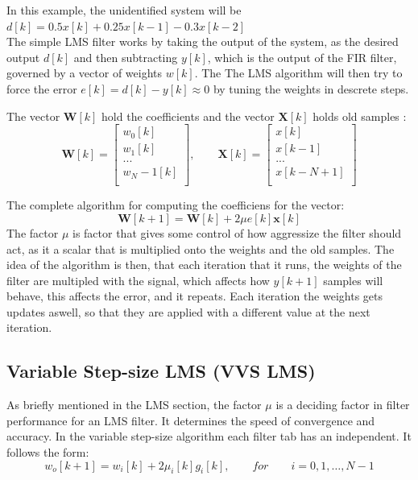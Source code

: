 In this example, the unidentified system will be $d[k]= 0.5x[k] + 0.25x[k-1] -0.3x[k-2]$\\

The simple LMS filter works by taking the output of the system, as the desired output $d[k]$ and then
subtracting $y[k]$, which is the output of the FIR filter, governed by a vector of weights $w[k]$. The
The LMS algorithm will then try to force the error $e[k] = d[k] - y[k] \approx 0$ by tuning the weights 
in descrete steps.

The vector $\mathbf{W}[k]$ hold the coefficients and the vector $\mathbf{X}[k]$ holds old samples :
\[
\mathbf{W}[k] = 
\begin{bmatrix}
    w_0[k]\\
    w_1[k]\\
    ...\\
    w_N-1[k]\\
\end{bmatrix},
\qquad
\mathbf{X}[k] = 
\begin{bmatrix}
    x[k]\\
    x[k-1]\\
    ...\\
    x[k-N+1]\\
\end{bmatrix}
\]

The complete algorithm for computing the coefficiens for the vector:
\[\mathbf{W}[k+1] = \mathbf{W}[k] + 2\mu e[k]\mathbf{x}[k]\]
The factor $\mu$ is factor that gives some control of how aggressize the filter should act, as it a scalar
that is multiplied onto the weights and the old samples. The idea of the algorithm is then, that each iteration
that it runs, the weights of the filter are multipled with the signal, which affects how $y[k+1]$ samples will behave,
this affects the error, and it repeats. Each iteration the weights gets updates aswell, so that they are
applied with a different value at the next iteration. 


\subsection{Variable Step-size LMS (VVS LMS)}
As briefly mentioned in the LMS section, the factor $\mu$ is a deciding factor
in filter performance for an LMS filter. It determines the speed of convergence and accuracy.
In the variable step-size algorithm each filter tab has an independent.
It follows the form:
\begin{equation}
w_o[k+1] = w_i[k] + 2\mu_i[k]g_i[k]
,\qquad
\textit{for} \qquad i = 0, 1, \dots, N-1
\label{VSS_LMS_W}
\end{equation}
  
